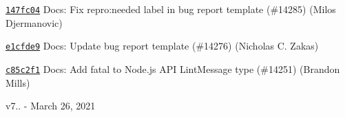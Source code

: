 \begin{DoxyItemize}
\item \href{https://github.com/eslint/eslint/commit/147fc045e699811fab33dddf77498324ddf7e9d6}{\texttt{ {\ttfamily 147fc04}}} Docs\+: Fix {\ttfamily repro\+:needed} label in bug report template (\#14285) (Milos Djermanovic)
\item \href{https://github.com/eslint/eslint/commit/e1cfde93eec71a15c2df1ad660a7a6171204ba80}{\texttt{ {\ttfamily e1cfde9}}} Docs\+: Update bug report template (\#14276) (Nicholas C. Zakas)
\item \href{https://github.com/eslint/eslint/commit/c85c2f1138a9e952655f19ee780ab0c8e35431a8}{\texttt{ {\ttfamily c85c2f1}}} Docs\+: Add fatal to Node.\+js API Lint\+Message type (\#14251) (Brandon Mills)
\end{DoxyItemize}

v7.. -\/ March 26, 2021


